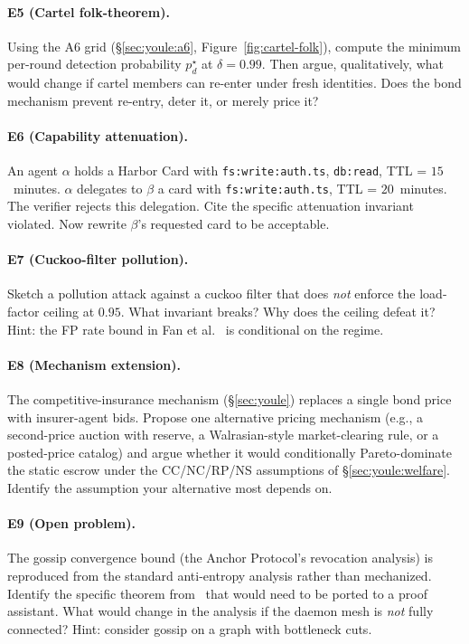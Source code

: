 \documentclass[11pt,a4paper]{article}
\theoremstyle{definition}
\theoremstyle{remark}
\begin{document}
\paragraph{E5 (Cartel folk-theorem).} Using the A6 grid (\S\ref{sec:youle:a6}, Figure~\ref{fig:cartel-folk}), compute the minimum per-round detection probability $p_d^\star$ at $\delta = 0.99$. Then argue, qualitatively, what would change if cartel members can re-enter under fresh identities. Does the bond mechanism prevent re-entry, deter it, or merely price it?

\paragraph{E6 (Capability attenuation).} An agent $\alpha$ holds a Harbor Card with \texttt{fs:write:auth.ts}, \texttt{db:read}, TTL = $15$~minutes. $\alpha$ delegates to $\beta$ a card with \texttt{fs:write:auth.ts}, TTL = $20$~minutes. The verifier rejects this delegation. Cite the specific attenuation invariant violated. Now rewrite $\beta$'s requested card to be acceptable.

\paragraph{E7 (Cuckoo-filter pollution).} Sketch a pollution attack against a cuckoo filter that does \emph{not} enforce the load-factor ceiling at $0.95$. What invariant breaks? Why does the ceiling defeat it? Hint: the FP rate bound in Fan et al.~\cite{fan2014cuckoo} is conditional on the regime.

\paragraph{E8 (Mechanism extension).} The competitive-insurance mechanism (\S\ref{sec:youle}) replaces a single bond price with insurer-agent bids. Propose one alternative pricing mechanism (e.g., a second-price auction with reserve, a Walrasian-style market-clearing rule, or a posted-price catalog) and argue whether it would conditionally Pareto-dominate the static escrow under the CC/NC/RP/NS assumptions of \S\ref{sec:youle:welfare}. Identify the assumption your alternative most depends on.

\paragraph{E9 (Open problem).} The gossip convergence bound (the Anchor Protocol's revocation analysis) is reproduced from the standard anti-entropy analysis rather than mechanized. Identify the specific theorem from~\cite{demers1987epidemic} that would need to be ported to a proof assistant. What would change in the analysis if the daemon mesh is \emph{not} fully connected? Hint: consider gossip on a graph with bottleneck cuts.
\end{document}
